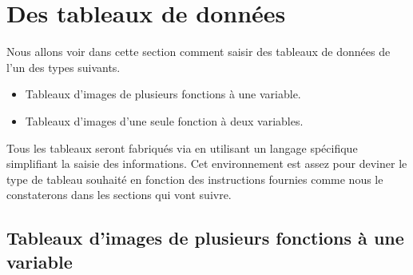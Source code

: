 \documentclass[10pt, a4paper]{article}
\newcommand\thispack{\tdocpack{tns-functab}}
\begin{document}
\begin{abstract}
{\begin{enumerate}
%
%
\end{enumerate}

\medskip

\noindent
Two important points to note.
\begin{itemize}
    \item Without the  package which does all the thankless work, the \thispack\ package would certainly not have seen the light of day.

    \item This documentation is also available in French.
\end{itemize}
}
\end{abstract}


\newpage
\tableofcontents
\newpage
\section{Des tableaux de données}

Nous allons voir dans cette section comment saisir des tableaux de données de l'un des types suivants.
\begin{itemize}
	\item Tableaux d'images de plusieurs fonctions à une variable.

	\item Tableaux d'images d'une seule fonction à deux variables.
\end{itemize}


\begin{tdocnote}
	Tous les tableaux seront fabriqués via  en utilisant un langage spécifique simplifiant la saisie des informations.
	Cet environnement est assez  pour deviner le type de tableau souhaité en fonction des instructions fournies comme nous le constaterons dans les sections qui vont suivre.
\end{tdocnote}





\subsection{Tableaux d'images de plusieurs fonctions à une variable}
\end{document}
